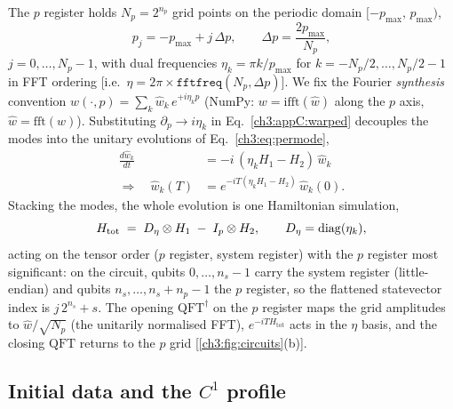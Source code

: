 The $p$ register holds $N_p = 2^{n_p}$ grid points on the periodic domain
$[-p_{\max},\,p_{\max})$,
\begin{equation}
  p_j = -p_{\max} + j\,\Delta p, \qquad
  \Delta p = \frac{2p_{\max}}{N_p},
  \label{ch3:appC:grid}
\end{equation}
$j = 0,\dots,N_p-1$, with dual frequencies $\eta_k = \pi k/p_{\max}$ for
$k = -N_p/2,\dots,N_p/2-1$ in FFT ordering [i.e.\
$\eta = 2\pi\times\texttt{fftfreq}(N_p,\Delta p)$].  We fix the Fourier
\emph{synthesis} convention $w(\cdot,p) = \sum_k \hat w_k\,e^{+i\eta_k p}$
(NumPy: $w = \mathrm{ifft}(\hat w)$ along the $p$ axis,
$\hat w = \mathrm{fft}(w)$).  Substituting
$\partial_p \to i\eta_k$ in Eq.~\eqref{ch3:appC:warped} decouples the modes
into the unitary evolutions of Eq.~\eqref{ch3:eq:permode},
\begin{equation}
\begin{split}
  \frac{d\hat w_k}{dt} &= -i\,(\eta_k H_1 - H_2)\,\hat w_k \\
  \Longrightarrow\quad
  \hat w_k(T) &= e^{-iT(\eta_k H_1 - H_2)}\,\hat w_k(0).
\end{split}
  \label{ch3:appC:permode}
\end{equation}
Stacking the modes, the whole evolution is one Hamiltonian simulation,
\begin{equation}
  H_{\mathrm{tot}} \;=\; D_\eta \otimes H_1 \;-\; I_p \otimes H_2,
  \qquad D_\eta = \diag(\eta_k),
  \label{ch3:appC:htot}
\end{equation}
acting on the tensor order ($p$ register, system register) with the $p$
register most significant: on the circuit, qubits $0,\dots,n_s-1$ carry
the system register (little-endian) and qubits $n_s,\dots,n_s+n_p-1$ the
$p$ register, so the flattened statevector index is $j\,2^{n_s} + s$.
The opening $\mathrm{QFT}^{\dagger}$ on the $p$ register maps the grid
amplitudes to $\hat w/\sqrt{N_p}$ (the unitarily normalised FFT),
$e^{-iTH_{\mathrm{tot}}}$ acts in the $\eta$ basis, and the closing
$\mathrm{QFT}$ returns to the $p$ grid [\ref{ch3:fig:circuits}(b)].

\subsection{Initial data and the $C^{1}$ profile}
\label{ch3:appC:initial}

